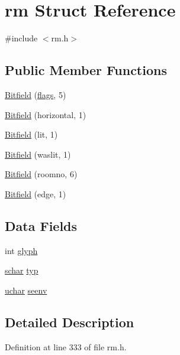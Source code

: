 \hypertarget{structrm}{\section{rm Struct Reference}
\label{structrm}
}


{\ttfamily \#include $<$rm.\+h$>$}

\subsection*{Public Member Functions}
\begin{DoxyCompactItemize}
\item 
\hyperlink{structrm_ae015d98d1f954468f29a7a878d1b5f8e}{Bitfield} (\hyperlink{decl_8c_a997133526e0c6bed44ebc0116a48b50a}{flags}, 5)
\item 
\hyperlink{structrm_aaa794b9ee9c3de06f9176201afc57713}{Bitfield} (horizontal, 1)
\item 
\hyperlink{structrm_adc683e7c6513df5d0c08dfc6787ea9e5}{Bitfield} (lit, 1)
\item 
\hyperlink{structrm_adb20f4ee7650eea320946a866bf10034}{Bitfield} (waslit, 1)
\item 
\hyperlink{structrm_a6f79495ca69f533a09e7463b7e4bf480}{Bitfield} (roomno, 6)
\item 
\hyperlink{structrm_a6b2ec40a967ea44fa6dc7739d5c1f2a1}{Bitfield} (edge, 1)
\end{DoxyCompactItemize}
\subsection*{Data Fields}
\begin{DoxyCompactItemize}
\item 
int \hyperlink{structrm_a35df3d254aba2b97739aed75313cbe5c}{glyph}
\item 
\hyperlink{config_8h_a0fd9ce9d735064461bebfe6037026093}{schar} \hyperlink{structrm_aa144ade377ba175f037c4e637329d4dc}{typ}
\item 
\hyperlink{config_8h_a65f85814a8290f9797005d3b28e7e5fc}{uchar} \hyperlink{structrm_a34555313c127be5f736123f994cb1770}{seenv}
\end{DoxyCompactItemize}


\subsection{Detailed Description}


Definition at line 333 of file rm.\+h.



